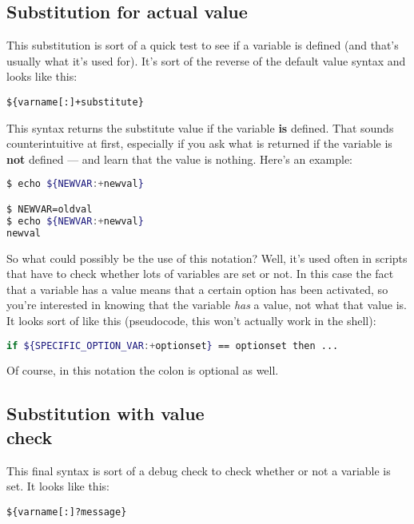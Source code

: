 \subsection{Substitution for actual value}
This substitution is sort of a quick test to see if a variable is defined (and
that's usually what it's used for). It's sort of the reverse of the default
value syntax and looks like this:
\scriptsize
\begin{verbatim}
${varname[:]+substitute}
\end{verbatim}
\normalsize
This syntax returns the substitute value if the variable \textbf{is} defined.
That sounds counterintuitive at first, especially if you ask what is returned
if the variable is \textbf{not} defined --- and learn that the value is
nothing. Here's an example:
\lstset{basicstyle=\scriptsize, numbers=left, captionpos=b, tabsize=4}
\begin{lstlisting}[caption=Actual value substitution,language={bash},
breaklines=true,xleftmargin=15pt,label=lst:Actual value substitution]
$ echo ${NEWVAR:+newval}

$ NEWVAR=oldval
$ echo ${NEWVAR:+newval}
newval
\end{lstlisting}

So what could possibly be the use of this notation? Well, it's used often in
scripts that have to check whether lots of variables are set or not. In this
case the fact that a variable has a value means that a certain option has been
activated, so you're interested in knowing that the variable \emph{has} a
value, not what that value is. It looks sort of like this (pseudocode, this
won't actually work in the shell):
\lstset{basicstyle=\scriptsize, numbers=left, captionpos=b, tabsize=4}
\begin{lstlisting}[caption=Default value assignment,language={bash},
breaklines=true,xleftmargin=15pt,label=lst:Default value assignment]
if ${SPECIFIC_OPTION_VAR:+optionset} == optionset then ...
\end{lstlisting}

Of course, in this notation the colon is optional as well.

\subsection{Substitution with value \\check}
This final syntax is sort of a debug check to check whether or not a variable
is set. It looks like this:
\scriptsize
\begin{verbatim}
${varname[:]?message}
\end{verbatim}
\normalsize

